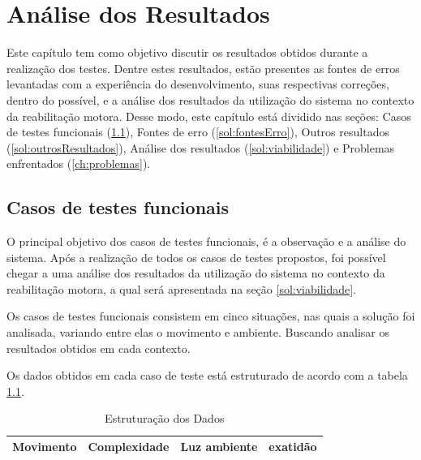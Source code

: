 \chapter[Análise dos Resultados]{Análise dos Resultados}\label{ch:analiseResultados}
  Este capítulo tem como objetivo discutir  os resultados obtidos durante a realização dos testes. Dentre estes
resultados, estão presentes as fontes de erros levantadas com a experiência do desenvolvimento,
suas respectivas correções, dentro do possível, e a análise dos resultados da utilização do
sistema no contexto da reabilitação motora. Desse modo, este
capítulo está dividido nas seções: Casos de testes funcionais (\ref{sec:testes}),
Fontes de erro (\ref{sol:fontesErro}), Outros resultados (\ref{sol:outrosResultados}), Análise dos resultados (\ref{sol:viabilidade}) e Problemas enfrentados (\ref{ch:problemas}).

\section{Casos de testes funcionais}\label{sec:testes}
  O principal objetivo dos casos de testes funcionais, é a observação e a análise do sistema. Após a realização de todos os casos de testes propostos, foi possível chegar a
uma análise dos resultados da utilização do sistema no contexto da reabilitação motora,
 a qual será apresentada na seção \ref{sol:viabilidade}.

 Os casos de testes funcionais consistem em cinco situações, nas quais a solução foi analisada,
variando entre elas o movimento e ambiente. Buscando analisar os resultados obtidos em cada contexto.

  Os dados obtidos em cada caso de teste está estruturado de acordo com a tabela \ref{tab:analise}.

  \begin{table}[H]
  \centering
  \caption{Estruturação dos Dados}
  \label{tab:analise}
  \begin{tabular}{@{}|l|l|l|l|@{}}
  \toprule
  \textbf{Movimento} & \textbf{Complexidade} & \textbf{Luz ambiente} & \textbf{exatidão} \\ \bottomrule
  \end{tabular}
  \end{table}

